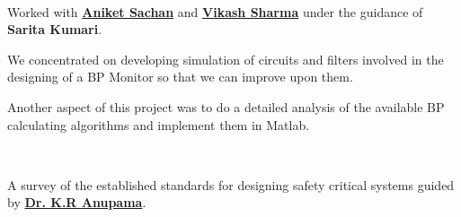 \documentclass[letterpaper]{deedy-resume} %
\begin{document}
\begin{minipage}[t]{0.74\textwidth}
 \\
\begin{tightitemize}
\item Worked with \textbf{\href{http://in.linkedin.com/in/aniketsachan}{Aniket Sachan}} and \textbf{\href{http://in.linkedin.com/pub/vikash-sharma/16/865/aba}{Vikash Sharma}} under the guidance of \textbf{Sarita Kumari}.
\item We concentrated on developing simulation of circuits and filters involved in the designing of a BP Monitor so that we can improve upon them.
\item Another aspect of this project was to do a detailed analysis of the available BP calculating algorithms and implement them in Matlab.
\end{tightitemize}

\sectionspace %


 \\
\begin{tightitemize}
\item A survey of the established standards for designing safety critical systems guided by \textbf{\href{http://universe.bits-pilani.ac.in/goa/anupkr/profile}{Dr. K.R Anupama}}.
\end{tightitemize}

\sectionspace %


\end{minipage} %



\end{document}

